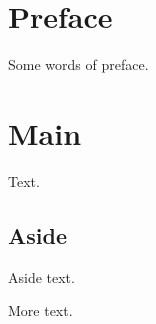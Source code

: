 \documentclass{article}
\begin{document}
\tableofcontents
\section*{Preface}
Some words of preface.
\section{Main}
Text.
\subsection*{Aside}
Aside text.

More text.
\end{document}
